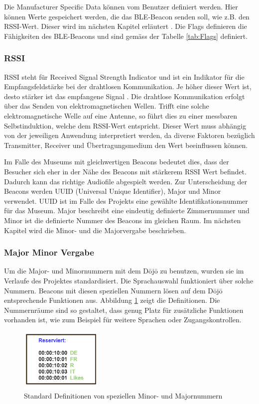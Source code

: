 Die Manufacturer Specific Data können vom Benutzer definiert werden. Hier können Werte gespeichert werden, die das BLE-Beacon senden soll, wie z.B. den RSSI-Wert. Dieser wird im nächsten Kapitel erläutert \cite{9_Teildokument_BT}. Die Flags definieren die Fähigkeiten des BLE-Beacons und sind gemäss der Tabelle \ref{tab:Flags} definiert.

\subsubsection{RSSI}
RSSI steht für Received Signal Strength Indicator und ist ein Indikator für die Empfangsfeldstärke bei der drahtlosen Kommunikation. Je höher dieser Wert ist, desto stärker ist das empfangene Signal \cite{10_Teildokument_BT}. Die drahtlose Kommunikation erfolgt über das Senden von elektromagnetischen Wellen. Trifft eine solche elektromagnetische Welle auf eine Antenne, so führt dies zu einer messbaren Selbstinduktion, welche dem RSSI-Wert entspricht. Dieser Wert muss abhängig von der jeweiligen Anwendung interpretiert werden, da diverse Faktoren bezüglich Transmitter, Receiver und Übertragungsmedium den Wert beeinflussen können.

Im Falle des Museums mit gleichwertigen Beacons bedeutet dies, dass der Besucher sich eher in der Nähe des Beacons mit stärkerem RSSI Wert befindet. Dadurch kann das richtige Audiofile abgespielt werden. Zur Unterscheidung der Beacons werden UUID (Universal Unique Identifier), Major und Minor verwendet. UUID ist im Falle des Projekts eine gewählte Identifikationsnummer für das Museum. Major beschreibt eine eindeutig definierte Zimmernummer und Minor ist die definierte Nummer des Beacons im gleichen Raum. Im nächsten Kapitel wird die Minor- und die Majorvergabe beschrieben.

\subsubsection{Major Minor Vergabe}
Um die Major- und Minornummern mit dem Dōjō zu benutzen, wurden sie im Verlaufe des Projektes standardisiert. Die Sprachauswahl funktioniert über solche Nummern. Beacons mit diesen speziellen Nummern lösen auf dem Dōjō entsprechende Funktionen aus. Abbildung \ref{fig:Bluetooth_def_MM} zeigt die Definitionen. Die Nummernräume sind so gestaltet, dass genug Platz für zusätzliche Funktionen vorhanden ist, wie zum Beispiel für weitere Sprachen oder Zugangskontrollen.

\begin{figure}[htbp!!!!]
	\centering
	\includegraphics[width=0.35\textwidth]{Data/Reserviert_picture.png}
	\caption[Defintion Minor- Majornummern]{Standard Definitionen von speziellen Minor- und Majornummern}
	\label{fig:Bluetooth_def_MM}
\end{figure}

